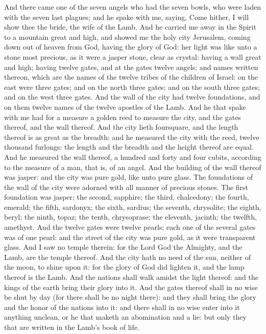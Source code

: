  And there came one of the seven angels who had the seven bowls, who were laden with the seven last plagues; and he spake with me, saying, Come hither, I will show thee the bride, the wife of the Lamb. 
 And he carried me away in the Spirit to a mountain great and high, and showed me the holy city Jerusalem, coming down out of heaven from God, 
 having the glory of God: her light was like unto a stone most precious, as it were a jasper stone, clear as crystal: 
 having a wall great and high; having twelve gates, and at the gates twelve angels; and names written thereon, which are the names of the twelve tribes of the children of Israel: 
 on the east were three gates; and on the north three gates; and on the south three gates; and on the west three gates. 
 And the wall of the city had twelve foundations, and on them twelve names of the twelve apostles of the Lamb. 
 And he that spake with me had for a measure a golden reed to measure the city, and the gates thereof, and the wall thereof. 
 And the city lieth foursquare, and the length thereof is as great as the breadth: and he measured the city with the reed, twelve thousand furlongs: the length and the breadth and the height thereof are equal. 
 And he measured the wall thereof, a hundred and forty and four cubits, according to the measure of a man, that is, of an angel. 
 And the building of the wall thereof was jasper: and the city was pure gold, like unto pure glass. 
 The foundations of the wall of the city were adorned with all manner of precious stones. The first foundation was jasper; the second, sapphire; the third, chalcedony; the fourth, emerald; 
 the fifth, sardonyx; the sixth, sardius; the seventh, chrysolite; the eighth, beryl; the ninth, topaz; the tenth, chrysoprase; the eleventh, jacinth; the twelfth, amethyst. 
 And the twelve gates were twelve pearls; each one of the several gates was of one pearl: and the street of the city was pure gold, as it were transparent glass. 
 And I saw no temple therein: for the Lord God the Almighty, and the Lamb, are the temple thereof. 
 And the city hath no need of the sun, neither of the moon, to shine upon it: for the glory of God did lighten it, and the lamp thereof is the Lamb. 
 And the nations shall walk amidst the light thereof: and the kings of the earth bring their glory into it. 
 And the gates thereof shall in no wise be shut by day (for there shall be no night there): 
 and they shall bring the glory and the honor of the nations into it: 
 and there shall in no wise enter into it anything unclean, or he that maketh an abomination and a lie: but only they that are written in the Lamb’s book of life. 